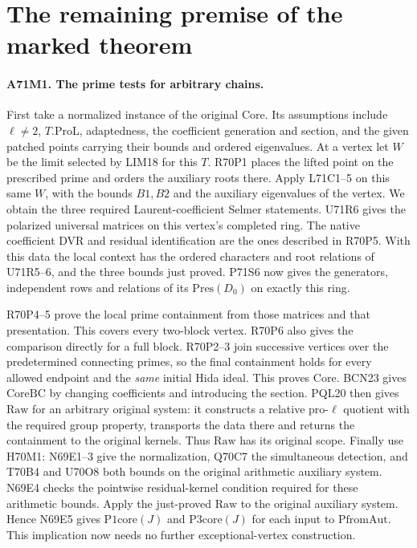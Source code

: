 \section{The remaining premise of the marked theorem}

\paragraph{A71M1. The prime tests for arbitrary chains.}
First take a normalized instance of the original $\mathrm{Core}$.
Its assumptions include $\ell\ne2$, $T.\mathrm{ProL}$, adaptedness,
the coefficient generation and section, and the given patched
points carrying their bounds and ordered eigenvalues. At a vertex
let $W$ be the limit selected by
LIM18 for this $T$. R70P1 places the lifted point on the
prescribed prime and orders the auxiliary roots there. Apply
L71C1--5 on this same $W$, with the bounds $B1,B2$ and the
auxiliary eigenvalues of the vertex. We obtain the three
required Laurent-coefficient Selmer statements. U71R6 gives
the polarized universal matrices on this vertex's completed
ring. The native coefficient DVR and residual identification
are the ones described in R70P5. With this data the local
context has the ordered characters and root relations of
U71R5--6, and the three bounds just proved. P71S6 now gives
the generators, independent rows and relations of its
$\mathrm{Pres}(D_0)$ on exactly this ring.

R70P4--5 prove the local prime containment from those matrices
and that presentation. This covers every two-block vertex.
R70P6 also gives the comparison directly for a full block.
R70P2--3 join successive vertices over the predetermined
connecting primes, so the final containment holds for every
allowed endpoint and the \emph{same} initial Hida ideal.
This proves $\mathrm{Core}$. BCN23 gives
$\mathrm{CoreBC}$ by changing coefficients and introducing the
section. PQL20 then gives $\mathrm{Raw}$ for an arbitrary original
system: it constructs a relative pro-$\ell$ quotient with
the required group property, transports the data there and returns
the containment to the original kernels. Thus $\mathrm{Raw}$ has
its original scope. Finally use H70M1: N69E1--3 give the
normalization, Q70C7 the simultaneous detection, and T70B4
and U70O8 both bounds on the original arithmetic auxiliary
system. N69E4 checks the pointwise residual-kernel condition required
for these arithmetic bounds. Apply the just-proved $\mathrm{Raw}$
to the original auxiliary system. Hence N69E5 gives
$\mathrm{P1core}(J)$ and $\mathrm{P3core}(J)$ for each
input to $\mathrm{PfromAut}$. This implication now needs
no further exceptional-vertex construction.

